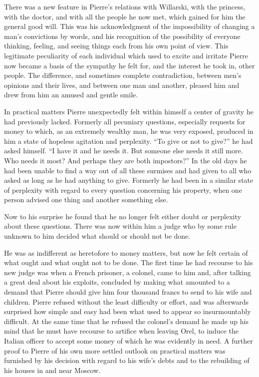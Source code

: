 There was a new feature in Pierre's relations with Willarski,
with the princess, with the doctor, and with all the people he
now met, which gained for him the general good will. This was his
acknowledgment of the impossibility of changing a man's
convictions by words, and his recognition of the possibility of
everyone thinking, feeling, and seeing things each from his own
point of view. This legitimate peculiarity of each individual
which used to excite and irritate Pierre now became a basis of
the sympathy he felt for, and the interest he took in, other
people. The difference, and sometimes complete contradiction,
between men's opinions and their lives, and between one man and
another, pleased him and drew from him an amused and gentle
smile.

In practical matters Pierre unexpectedly felt within himself a
center of gravity he had previously lacked. Formerly all
pecuniary questions, especially requests for money to which, as
an extremely wealthy man, he was very exposed, produced in him a
state of hopeless agitation and perplexity. ``To give or not to
give?'' he had asked himself. ``I have it and he needs it. But
someone else needs it still more. Who needs it most? And perhaps
they are both impostors?'' In the old days he had been unable to
find a way out of all these surmises and had given to all who
asked as long as he had anything to give. Formerly he had been in
a similar state of perplexity with regard to every question
concerning his property, when one person advised one thing and
another something else.

Now to his surprise he found that he no longer felt either doubt
or perplexity about these questions. There was now within him a
judge who by some rule unknown to him decided what should or
should not be done.

He was as indifferent as heretofore to money matters, but now he
felt certain of what ought and what ought not to be done. The
first time he had recourse to his new judge was when a French
prisoner, a colonel, came to him and, after talking a great deal
about his exploits, concluded by making what amounted to a demand
that Pierre should give him four thousand francs to send to his
wife and children. Pierre refused without the least difficulty or
effort, and was afterwards surprised how simple and easy had been
what used to appear so insurmountably difficult. At the same time
that he refused the colonel's demand he made up his mind that he
must have recourse to artifice when leaving Orel, to induce the
Italian officer to accept some money of which he was evidently in
need. A further proof to Pierre of his own more settled outlook
on practical matters was furnished by his decision with regard to
his wife's debts and to the rebuilding of his houses in and near
Moscow.

